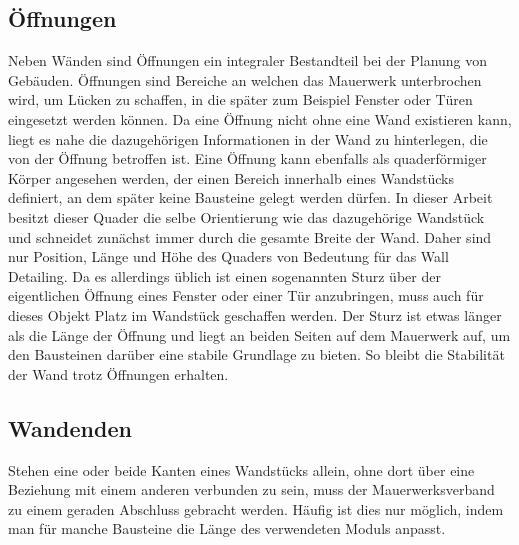 \subsection{Öffnungen}
Neben Wänden sind Öffnungen ein integraler Bestandteil bei der Planung von Gebäuden.
Öffnungen sind Bereiche an welchen das Mauerwerk unterbrochen wird, um Lücken zu schaffen, in die später zum Beispiel Fenster oder Türen eingesetzt werden können.
Da eine Öffnung nicht ohne eine Wand existieren kann, liegt es nahe die dazugehörigen Informationen in der Wand zu hinterlegen, die von der Öffnung betroffen ist.
Eine Öffnung kann ebenfalls als quaderförmiger Körper angesehen werden, der einen Bereich innerhalb eines Wandstücks definiert, an dem später keine Bausteine gelegt werden dürfen.
In dieser Arbeit besitzt dieser Quader die selbe Orientierung wie das dazugehörige Wandstück und schneidet zunächst immer durch die gesamte Breite der Wand.
Daher sind nur Position, Länge und Höhe des Quaders von Bedeutung für das Wall Detailing.
Da es allerdings üblich ist einen sogenannten Sturz über der eigentlichen Öffnung eines Fenster oder einer Tür anzubringen, muss auch für dieses Objekt Platz im Wandstück geschaffen werden. 
Der Sturz ist etwas länger als die Länge der Öffnung und liegt an beiden Seiten auf dem Mauerwerk auf, um den Bausteinen darüber eine stabile Grundlage zu bieten.
So bleibt die Stabilität der Wand trotz Öffnungen erhalten.

\subsection{Wandenden}
Stehen eine oder beide Kanten eines Wandstücks allein, ohne dort über eine Beziehung mit einem anderen verbunden zu sein, muss der Mauerwerksverband zu einem geraden Abschluss gebracht werden.
Häufig ist dies nur möglich, indem man für manche Bausteine die Länge des verwendeten Moduls anpasst.

